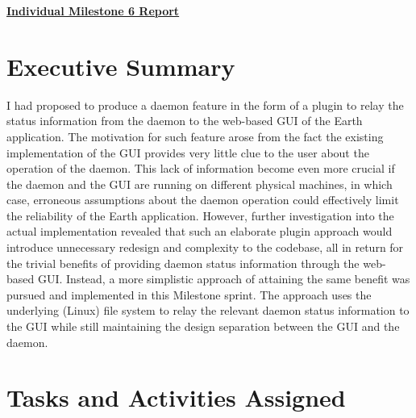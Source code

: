 \pagestyle{headings}

\begin{center}
{\LARGE\textbf{\underline{{Individual Milestone 6 Report}}}}
\end{center}

\section*{Executive Summary}

I had proposed to produce a daemon feature in the form of a plugin to relay the status information from the daemon to the web-based GUI of the Earth application. The motivation for such feature arose from the fact the existing implementation of the GUI provides very little clue to the user about the operation of the daemon. This lack of information become even more crucial if the daemon and the GUI are running on different physical machines, in which case, erroneous assumptions about the daemon operation could effectively limit the reliability of the Earth application. However, further investigation into the actual implementation revealed that such an elaborate plugin approach would introduce unnecessary redesign and complexity to the codebase, all in return for the trivial benefits of providing daemon status information through the web-based GUI. Instead, a more simplistic approach of attaining the same benefit was pursued and implemented in this Milestone sprint. The approach uses the underlying (Linux) file system to relay the relevant daemon status information to the GUI while still maintaining the design separation between the GUI and the daemon.

\section*{Tasks and Activities Assigned}

